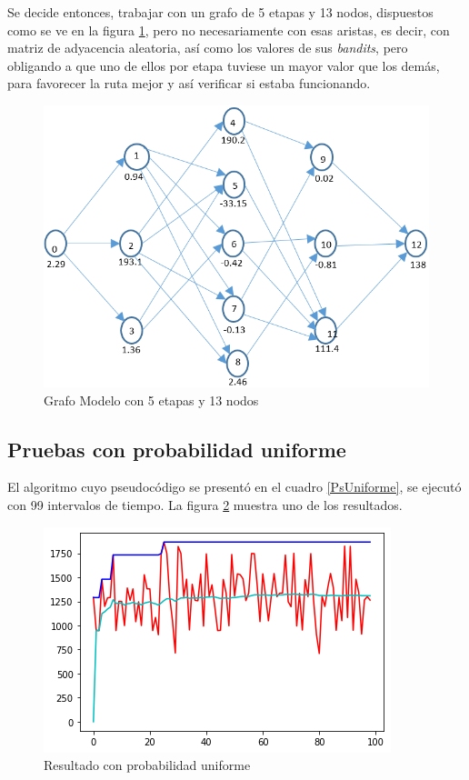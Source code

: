 Se decide entonces, trabajar con un grafo de 5 etapas y 13 nodos, dispuestos como se ve en la figura \ref{Grafomodelo}, pero no necesariamente con esas aristas, es decir, con matriz de adyacencia aleatoria, así como los valores de sus \textit{bandits}, pero obligando a que uno de ellos por etapa tuviese un mayor valor que los demás, para favorecer la ruta mejor y así verificar si estaba funcionando.

\begin{figure}[h]
  \centering
    \includegraphics[scale=0.5]{Grafo5L.png}
  \caption[Grafo Modelo]{Grafo Modelo con 5 etapas y 13 nodos}
  \label{Grafomodelo}
\end{figure}


\subsection{Pruebas con probabilidad uniforme}

El algoritmo cuyo pseudocódigo se presentó en el cuadro \ref{PsUniforme}, se ejecutó con 99 intervalos de tiempo. La figura \ref{fig:uniforme} muestra uno de los resultados. 

\begin{figure}[H]
	\centering
	\includegraphics[scale=1]{Uniforme}
	\caption{Resultado con probabilidad uniforme}
	\label{fig:uniforme}
\end{figure}

